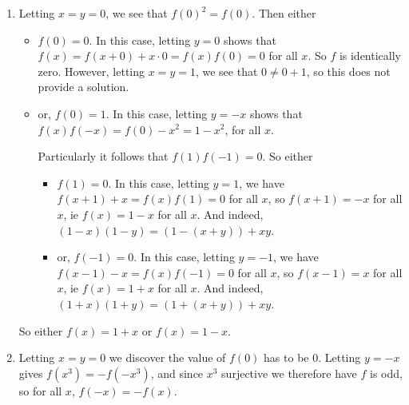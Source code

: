 \documentclass[a4paper,12pt,fleqn]{article}
\begin{document}
\begin{enumerate}
 \item

  Letting \(x = y = 0\), we see that \(f(0)^2 = f(0)\). Then either
  \begin{itemize}
   \item
    \(f(0) = 0\). In this case, letting \(y = 0\) shows that
    \(f(x) = f(x + 0) + x \cdot 0 =  f(x)f(0) = 0\) for all \(x\). So \(f\) is
    identically zero. However, letting \(x = y = 1\), we see that
    \(0 \ne 0 + 1\), so this does not provide a solution.
   \item
    or, \(f(0) = 1\). In this case, letting \(y = -x\) shows that
    \(f(x)f(-x) = f(0) - x^2 = 1 - x^2\), for all \(x\).

    Particularly it follows that \(f(1) f(-1) = 0\). So either
    \begin{itemize}
     \item
      \(f(1) = 0\). In this case, letting \(y = 1\), we have
      \(f(x + 1) + x = f(x) f(1) = 0\) for all \(x\), so
      \(f(x + 1) = -x\) for all \(x\), ie \(f(x) = 1 - x\) for all \(x\). And
      indeed, \((1 - x)(1 - y) = (1 - (x + y)) + xy\).
     \item
      or, \(f(-1) = 0\). In this case, letting \(y = -1\), we have
      \(f(x - 1) - x = f(x) f(-1) = 0\) for all \(x\), so
      \(f(x - 1) = x\) for all \(x\), ie \(f(x) = 1 + x\) for all \(x\). And
      indeed, \((1 + x)(1 + y) = (1 + (x + y)) + xy\).
    \end{itemize}
  \end{itemize}
  So either \(f(x) = 1 + x\) or \(f(x) = 1 - x\).
 \item

  Letting \(x = y = 0\) we discover the value of \(f(0)\) has to be \(0\).
  Letting \(y = -x\) gives \(f(x^3) = -f(-x^3)\), and since \(x^3\) surjective
  we therefore have \(f\) is odd, so for all \(x\), \(f(-x) = -f(x)\).


\end{enumerate}
\end{document}
